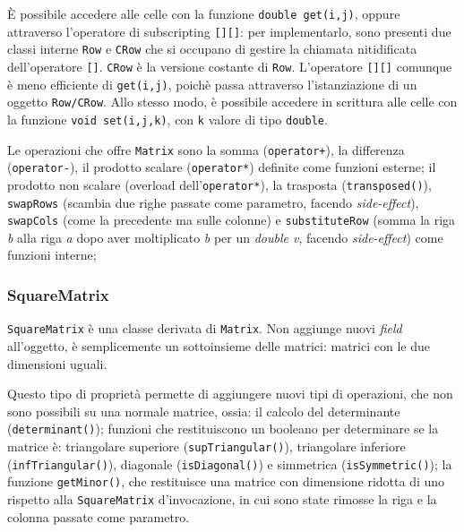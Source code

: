 È possibile accedere alle celle con la funzione \texttt{double get(i,j)}, 
oppure attraverso l'operatore di subscripting \texttt{[][]}: per implementarlo, sono presenti due classi interne
\texttt{Row} e \texttt{CRow} che si occupano di gestire la chiamata nitidificata dell'operatore 
\texttt{[]}. \texttt{CRow} è la versione costante di \texttt{Row}. L'operatore \texttt{[][]} comunque è meno
efficiente di \texttt{get(i,j)}, poichè passa attraverso l'istanziazione di un oggetto \texttt{Row/CRow}.
Allo stesso modo, è possibile accedere in scrittura alle celle con la funzione \mbox{\texttt{void set(i,j,k)}}, con 
\texttt{k} valore di tipo \texttt{double}.

Le operazioni che offre \texttt{Matrix} sono
la somma (\texttt{operator+}), la differenza (\texttt{operator-}), il prodotto scalare (\texttt{operator*})
definite come funzioni esterne; il prodotto non scalare (overload dell'\texttt{operator*}), la trasposta (\texttt{transposed()}), \texttt{swapRows} 
(scambia due righe passate come parametro, facendo \emph{side-effect}), \texttt{swapCols} (come la precedente 
ma sulle colonne) e \texttt{substituteRow} (somma la riga \emph{b} alla riga \emph{a} dopo aver moltiplicato 
\emph{b} per un \emph{double v}, facendo \emph{side-effect}) come funzioni interne;

\subsubsection{SquareMatrix} 
\texttt{SquareMatrix} è una classe derivata di \texttt{Matrix}. Non aggiunge nuovi \emph{field} all'oggetto,
è semplicemente un sottoinsieme delle matrici: matrici con le due dimensioni uguali.\par
Questo tipo di proprietà permette di aggiungere nuovi tipi di operazioni, che non sono possibili su una
normale matrice, ossia: il calcolo del determinante (\texttt{determinant()}); funzioni che restituiscono un 
booleano per determinare se la matrice è: triangolare superiore (\texttt{supTriangular()}), triangolare 
inferiore (\texttt{infTriangular()}), diagonale (\texttt{isDiagonal()}) e simmetrica (\texttt{isSymmetric()});
la funzione \texttt{getMinor()}, che restituisce una matrice con dimensione ridotta di uno rispetto alla 
\texttt{SquareMatrix} d'invocazione, in cui sono state rimosse la riga e la colonna passate come parametro.

